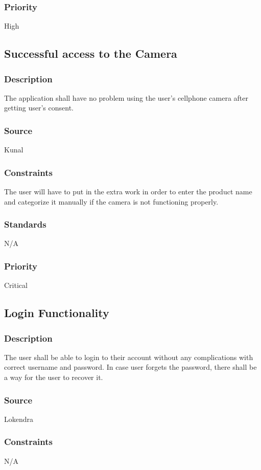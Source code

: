 \subsubsection{Priority}
High

\subsection{Successful access to the Camera}
\subsubsection{Description}
The application shall have no problem using the user’s cellphone camera after getting user’s consent.
\subsubsection{Source}
Kunal
\subsubsection{Constraints}
The user will have to put in the extra work in order to enter the product name and categorize it manually if the camera is not functioning properly.
\subsubsection{Standards}
N/A
\subsubsection{Priority}
Critical

\subsection{Login Functionality}
\subsubsection{Description}
The user shall be able to login to their account without any complications with correct username and password. In case user forgets the password, there shall be a way for the user to recover it.
\subsubsection{Source}
Lokendra
\subsubsection{Constraints}
N/A
